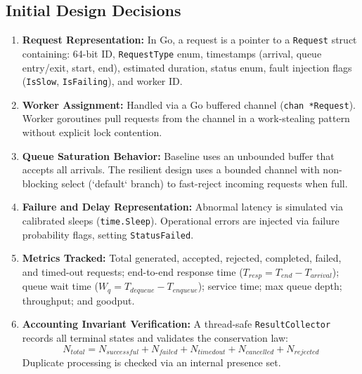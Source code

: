 \documentclass[11pt]{article}
\begin{document}
\subsection*{Initial Design Decisions}
\begin{enumerate}[label=\textbf{\arabic*.}, leftmargin=1.5em, itemsep=0.25em]
    \item \textbf{Request Representation:} In Go, a request is a pointer to a \texttt{Request} struct containing: 64-bit ID, \texttt{RequestType} enum, timestamps (arrival, queue entry/exit, start, end), estimated duration, status enum, fault injection flags (\texttt{IsSlow}, \texttt{IsFailing}), and worker ID.
    \item \textbf{Worker Assignment:} Handled via a Go buffered channel (\texttt{chan *Request}). Worker goroutines pull requests from the channel in a work-stealing pattern without explicit lock contention.
    \item \textbf{Queue Saturation Behavior:} Baseline uses an unbounded buffer that accepts all arrivals. The resilient design uses a bounded channel with non-blocking select (`default` branch) to fast-reject incoming requests when full.
    \item \textbf{Failure and Delay Representation:} Abnormal latency is simulated via calibrated sleeps (\texttt{time.Sleep}). Operational errors are injected via failure probability flags, setting \texttt{StatusFailed}.
    \item \textbf{Metrics Tracked:} Total generated, accepted, rejected, completed, failed, and timed-out requests; end-to-end response time ($T_{resp} = T_{end} - T_{arrival}$); queue wait time ($W_q = T_{dequeue} - T_{enqueue}$); service time; max queue depth; throughput; and goodput.
    \item \textbf{Accounting Invariant Verification:} A thread-safe \texttt{ResultCollector} records all terminal states and validates the conservation law:
    \begin{equation}
        N_{total} = N_{successful} + N_{failed} + N_{timedout} + N_{cancelled} + N_{rejected}
    \end{equation}
    Duplicate processing is checked via an internal presence set.
\end{enumerate}
\end{document}
